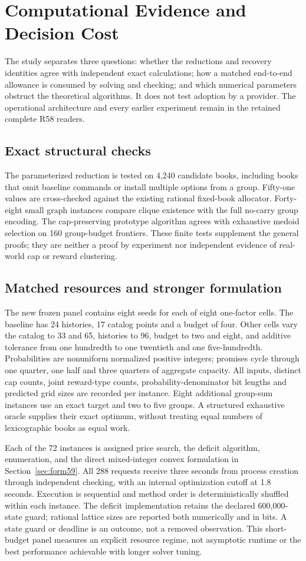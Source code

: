 \section{Computational Evidence and Decision Cost}\label{sec:study59}
The study separates three questions: whether the reductions and recovery identities agree with independent exact calculations; how a matched end-to-end allowance is consumed by solving and checking; and which numerical parameters obstruct the theoretical algorithms. It does not test adoption by a provider. The operational architecture and every earlier experiment remain in the retained complete R58 readers.

\subsection{Exact structural checks}
The parameterized reduction is tested on 4,240 candidate books, including books that omit baseline commands or install multiple options from a group. Fifty-one values are cross-checked against the existing rational fixed-book allocator. Forty-eight small graph instances compare clique existence with the full no-carry group encoding. The cap-preserving prototype algorithm agrees with exhaustive medoid selection on 160 group-budget frontiers. These finite tests supplement the general proofs; they are neither a proof by experiment nor independent evidence of real-world cap or reward clustering.

\subsection{Matched resources and stronger formulation}
The new frozen panel contains eight seeds for each of eight one-factor cells. The baseline has 24 histories, 17 catalog points and a budget of four. Other cells vary the catalog to 33 and 65, histories to 96, budget to two and eight, and additive tolerance from one hundredth to one twentieth and one five-hundredth. Probabilities are nonuniform normalized positive integers; promises cycle through one quarter, one half and three quarters of aggregate capacity. All inputs, distinct cap counts, joint reward-type counts, probability-denominator bit lengths and predicted grid sizes are recorded per instance. Eight additional group-sum instances use an exact target and two to five groups. A structured exhaustive oracle supplies their exact optimum, without treating equal numbers of lexicographic books as equal work.

Each of the 72 instances is assigned price search, the deficit algorithm, enumeration, and the direct mixed-integer convex formulation in Section~\ref{sec:form59}. All 288 requests receive three seconds from process creation through independent checking, with an internal optimization cutoff at 1.8 seconds. Execution is sequential and method order is deterministically shuffled within each instance. The deficit implementation retains the declared 600,000-state guard; rational lattice sizes are reported both numerically and in bits. A state guard or deadline is an outcome, not a removed observation. This short-budget panel measures an explicit resource regime, not asymptotic runtime or the best performance achievable with longer solver tuning.

